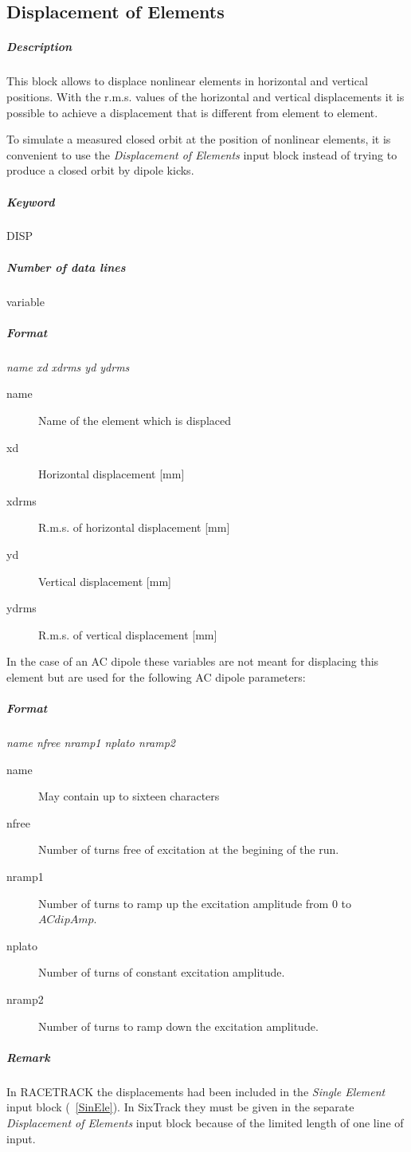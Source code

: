 \documentclass[a4paper,11pt]{report}
\begin{document}
\subsection{Displacement of Elements} \label{DisEle}

\subparagraph{Description} This block allows to displace nonlinear
elements in horizontal and vertical positions.  With the r.m.s. values of
the horizontal and vertical displacements it is possible to achieve a
displacement that is different from element to element.

To simulate a measured closed orbit at the position of nonlinear
elements, it is convenient to use the {\em Displacement of Elements}
\/input block instead of trying to produce a closed orbit by dipole
kicks.

\subparagraph{Keyword} DISP \subparagraph{Number of data lines}
variable

\subparagraph{Format} {\em name xd xdrms yd ydrms}

\begin{description}
\item [name] Name of the element which is displaced
\item [xd] Horizontal displacement [mm]
\item [xdrms] R.m.s. of horizontal displacement [mm]
\item [yd] Vertical displacement [mm]
\item [ydrms] R.m.s. of vertical displacement [mm]
\end{description}

In the case of an AC dipole these variables are not meant for
displacing this element but are used for the following AC dipole
parameters:
\subparagraph{Format} {\em name nfree nramp1 nplato nramp2}
\begin{description}
\item [name] May contain up to sixteen characters
\item [nfree] Number of turns free of excitation at the begining of
  the run.
\item [nramp1] Number of turns to ramp up the excitation amplitude 
  from 0 to $ACdipAmp$.
\item [nplato] Number of turns of constant excitation amplitude. 
\item [nramp2] Number of turns to ramp down the excitation amplitude.
\end{description}

\subparagraph{Remark} In RACETRACK the displacements had been included
in the {\em Single Element} \/input block (~\ref{SinEle}). In SixTrack
they must be given in the separate {\em Displacement of Elements}
\/input block because of the limited length of one line of input.
\end{document}

